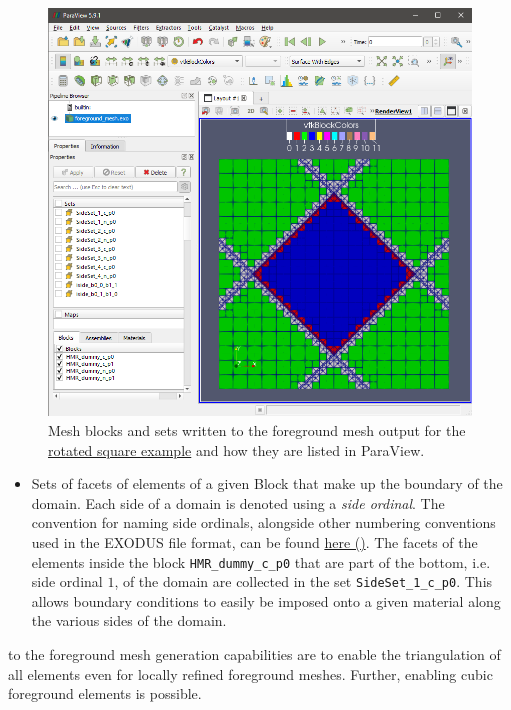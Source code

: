 \begin{figure}[h]
    \begin{center}
    \includegraphics[width=12cm]{Figures/paraview_mesh_sets.png}
    \caption{Mesh blocks and sets written to the foreground mesh output for the \href{https://github.com/kkmaute/moris/blob/main/share/doc/mesh_generation/examples/Rotated_Square_Example.xml}{rotated square example} and how they are listed in ParaView.} 
    \label{fig:meshsets_paraview}
    \end{center}
\end{figure}

\begin{itemize}
    \item Sets of facets of elements of a given Block that make up the boundary of the domain. Each side of a domain is denoted using a \emph{side ordinal}. The convention for naming side ordinals, alongside other numbering conventions used in the EXODUS file format, can be found \href{https://sandialabs.github.io/seacas-docs/html/md_include_exodus_element_types.html}{here (\ExternalLink)}.
    The facets of the elements inside the block \texttt{HMR\_dummy\_c\_p0} that are part of the bottom, i.e. side ordinal $1$, of the domain are collected in the set \texttt{SideSet\_1\_c\_p0}. This allows boundary conditions to easily be imposed onto a given material along the various sides of the domain.
\end{itemize}

 to the foreground mesh generation capabilities are to enable the triangulation of all elements even for locally refined foreground meshes. Further, enabling cubic foreground elements is possible.

